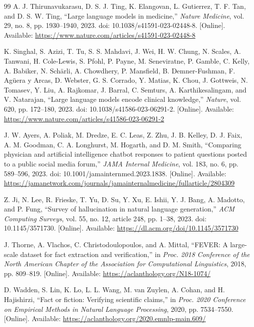 \begin{thebibliography}{99}
A. J. Thirunavukarasu, D. S. J. Ting, K. Elangovan, L. Gutierrez, T. F. Tan, and D. S. W. Ting,
``Large language models in medicine,''
\textit{Nature Medicine}, vol. 29, no. 8, pp. 1930--1940, 2023.
doi: 10.1038/s41591-023-02448-8.
[Online]. Available: \url{https://www.nature.com/articles/s41591-023-02448-8}

K. Singhal, S. Azizi, T. Tu, S. S. Mahdavi, J. Wei, H. W. Chung, N. Scales, A. Tanwani, H. Cole-Lewis, S. Pfohl, P. Payne, M. Seneviratne, P. Gamble, C. Kelly, A. Babiker, N. Sch{\"a}rli, A. Chowdhery, P. Mansfield, B. Demner-Fushman, F. Ag{\"u}era y Arcas, D. Webster, G. S. Corrado, Y. Matias, K. Chou, J. Gottweis, N. Tomasev, Y. Liu, A. Rajkomar, J. Barral, C. Semturs, A. Karthikesalingam, and V. Natarajan,
``Large language models encode clinical knowledge,''
\textit{Nature}, vol. 620, pp. 172--180, 2023.
doi: 10.1038/s41586-023-06291-2.
[Online]. Available: \url{https://www.nature.com/articles/s41586-023-06291-2}

J. W. Ayers, A. Poliak, M. Dredze, E. C. Leas, Z. Zhu, J. B. Kelley, D. J. Faix, A. M. Goodman, C. A. Longhurst, M. Hogarth, and D. M. Smith,
``Comparing physician and artificial intelligence chatbot responses to patient questions posted to a public social media forum,''
\textit{JAMA Internal Medicine}, vol. 183, no. 6, pp. 589--596, 2023.
doi: 10.1001/jamainternmed.2023.1838.
[Online]. Available: \url{https://jamanetwork.com/journals/jamainternalmedicine/fullarticle/2804309}

Z. Ji, N. Lee, R. Frieske, T. Yu, D. Su, Y. Xu, E. Ishii, Y. J. Bang, A. Madotto, and P. Fung,
``Survey of hallucination in natural language generation,''
\textit{ACM Computing Surveys}, vol. 55, no. 12, article 248, pp. 1--38, 2023.
doi: 10.1145/3571730.
[Online]. Available: \url{https://dl.acm.org/doi/10.1145/3571730}

J. Thorne, A. Vlachos, C. Christodoulopoulos, and A. Mittal,
``FEVER: A large-scale dataset for fact extraction and verification,''
in \textit{Proc. 2018 Conference of the North American Chapter of the Association for Computational Linguistics}, 2018, pp. 809--819.
[Online]. Available: \url{https://aclanthology.org/N18-1074/}

D. Wadden, S. Lin, K. Lo, L. L. Wang, M. van Zuylen, A. Cohan, and H. Hajishirzi,
``Fact or fiction: Verifying scientific claims,''
in \textit{Proc. 2020 Conference on Empirical Methods in Natural Language Processing}, 2020, pp. 7534--7550.
[Online]. Available: \url{https://aclanthology.org/2020.emnlp-main.609/}


\end{thebibliography}
